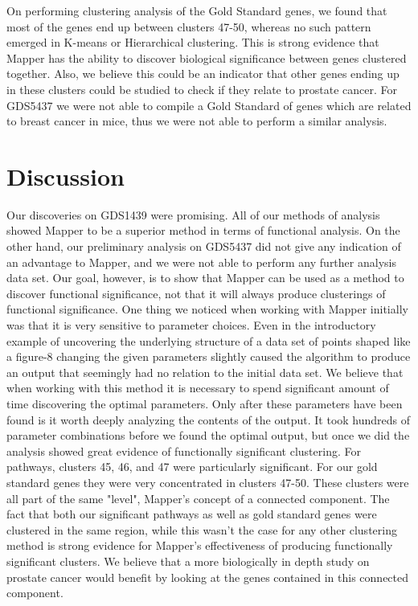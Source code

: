 \documentclass[preprint,10pt]{elsarticle}
\begin{document}
On performing clustering analysis of the Gold Standard genes, we found that most of the genes end up between clusters 47-50, whereas no such pattern emerged in K-means or Hierarchical clustering. This is strong evidence that Mapper has the ability to discover biological significance between genes clustered together. Also, we believe this could be an indicator that other genes ending up in these clusters could be studied to check if they relate to prostate cancer.
	For GDS5437 we were not able to compile a Gold Standard of genes which are related to breast cancer in mice, thus we were not able to perform a similar analysis.


\section{Discussion}
	Our discoveries on GDS1439 were promising. All of our methods of analysis showed Mapper to be a superior method in terms of functional analysis. On the other hand, our preliminary analysis on GDS5437 did not give any indication of an advantage to Mapper, and we were not able to perform any further analysis data set. Our goal, however, is to show that Mapper can be used as a method to discover functional significance, not that it will always produce clusterings of functional significance. One thing we noticed when working with Mapper initially was that it is very sensitive to parameter choices. Even in the introductory example of uncovering the underlying structure of a data set of points shaped like a figure-8 changing the given parameters slightly caused the algorithm to produce an output that seemingly had no relation to the initial data set. We believe that when working with this method it is necessary to spend significant amount of time discovering the optimal parameters. Only after these parameters have been found is it worth deeply analyzing the contents of the output. It took hundreds of parameter combinations before we found the optimal output, but once we did the analysis showed great evidence of functionally significant clustering. For pathways, clusters 45, 46, and 47 were particularly significant. For our gold standard genes they were very concentrated in clusters 47-50. These clusters were all part of the same "level", Mapper's concept of a connected component. The fact that both our significant pathways as well as gold standard genes were clustered in the same region, while this wasn't the case for any other clustering method is strong evidence for Mapper's effectiveness of producing functionally significant clusters. We believe that a more biologically in depth study on prostate cancer would benefit by looking at the genes contained in this connected component.
\end{document}
